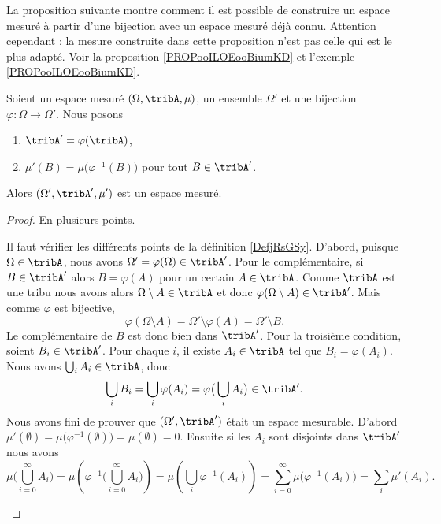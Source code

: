 La proposition suivante montre comment il est possible de construire un espace mesuré à partir d'une bijection avec un espace mesuré déjà connu. Attention cependant : la mesure construite dans cette proposition n'est pas celle qui est le plus adapté. Voir la proposition \ref{PROPooILOEooBiumKD} et l'exemple \ref{PROPooILOEooBiumKD}.
\begin{proposition}     \label{PROPooXQHTooUxJoyq}
	Soient un espace mesuré \( (\Omega,\tribA,\mu)\), un ensemble \( \Omega'\) et une bijection \( \varphi\colon \Omega\to \Omega'\). Nous posons
	\begin{enumerate}
		\item
		      \( \tribA'=\varphi(\tribA)\),
		\item
		      \( \mu'(B)=\mu\big( \varphi^{-1}(B) \big)\) pour tout \( B\in\tribA'\).
	\end{enumerate}
	Alors \( (\Omega',\tribA',\mu')\) est un espace mesuré.
\end{proposition}

\begin{proof}
	En plusieurs points.
	\begin{subproof}
		Il faut vérifier les différents points de la définition \ref{DefjRsGSy}. D'abord, puisque \( \Omega\in\tribA\), nous avons \( \Omega'=\varphi(\Omega)\in \tribA'\). Pour le complémentaire, si \( B\in\tribA'\) alors \( B=\varphi(A)\) pour un certain \( A\in \tribA\). Comme \( \tribA\) est une tribu nous avons alors \( \Omega\setminus A\in\tribA\) et donc \( \varphi(\Omega\setminus A)\in \tribA'\). Mais comme \( \varphi\) est bijective,
		\begin{equation}
			\varphi(\Omega\setminus A)=\Omega'\setminus\varphi(A)=\Omega'\setminus B.
		\end{equation}
		Le complémentaire de \( B\) est donc bien dans \( \tribA'\). Pour la troisième condition, soient \( B_i\in\tribA'\). Pour chaque \( i\), il existe \( A_i\in \tribA\) tel que \( B_i=\varphi(A_i)\). Nous avons \( \bigcup_iA_i\in \tribA\), donc
		\begin{equation}
			\bigcup_iB_i=\bigcup_i\varphi(A_i)=\varphi\big( \bigcup_iA_i \big)\in \tribA'.
		\end{equation}
		Nous avons fini de prouver que \( (\Omega',\tribA')\) était un espace mesurable.
		D'abord \( \mu'(\emptyset)=\mu\big( \varphi^{-1}(\emptyset) \big)=\mu(\emptyset)=0\). Ensuite si les \( A_i\) sont disjoints dans \( \tribA'\) nous avons
		\begin{equation}
			\mu\big( \bigcup_{i=0}^{\infty}A_i \big)=\mu\left( \varphi^{-1}\big( \bigcup_{i=0}^{\infty}A_i \big) \right)=\mu\left( \bigcup_i\varphi^{-1}(A_i) \right)=\sum_{i=0}^{\infty}\mu\big( \varphi^{-1}(A_i) \big)=\sum_i\mu'(A_i).
		\end{equation}
	\end{subproof}
\end{proof}

